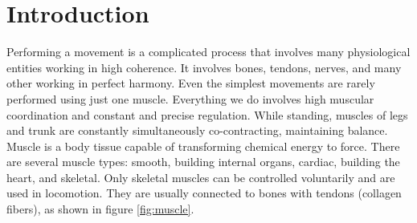 

\chapter{Introduction}

Performing a movement is a complicated process that involves many physiological entities working in high coherence. It involves bones, tendons, nerves, and many other working in perfect harmony. Even the simplest movements are rarely performed using just one muscle. Everything we do involves high muscular coordination and constant and precise regulation. While standing, muscles of legs and trunk are constantly simultaneously co-contracting, maintaining balance.  
Muscle is a body tissue capable of transforming chemical energy to force. There are several muscle types: smooth, building internal organs, cardiac, building the heart, and skeletal. Only skeletal muscles can be controlled voluntarily and are used in locomotion. They are usually connected to bones with tendons (collagen fibers), as shown in figure \ref{fig:muscle}.

